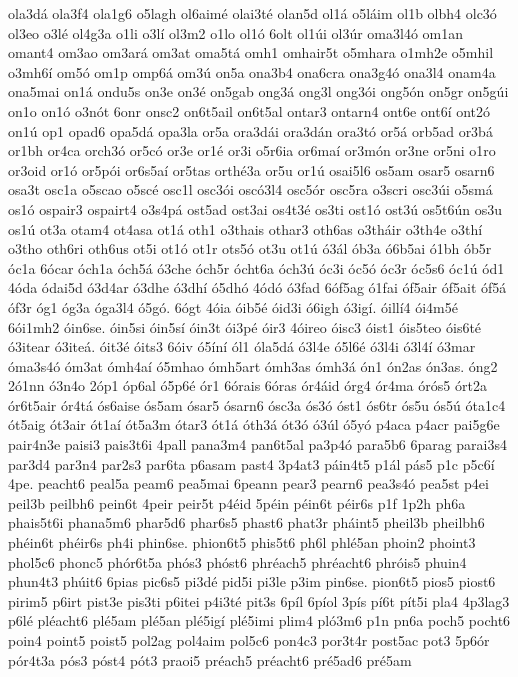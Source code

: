 {ola3dá
ola3f4
ola1g6
o5lagh
ol6aimé
olai3té
olan5d
ol1á
o5láim
ol1b
olbh4
olc3ó
ol3eo
o3lé
ol4g3a
o1li
o3lí
ol3m2
o1lo
ol1ó
6olt
ol1úi
ol3úr
oma3l4ó
om1an
omant4
om3ao
om3ará
om3at
oma5tá
omh1
omhair5t
o5mhara
o1mh2e
o5mhil
o3mh6í
om5ó
om1p
omp6á
om3ú
on5a
ona3b4
ona6cra
ona3g4ó
ona3l4
onam4a
ona5mai
on1á
ondu5s
on3e
on3é
on5gab
ong3á
ong3l
ong3ói
ong5ón
on5gr
on5gúi
on1o
on1ó
o3nót
6onr
onsc2
on6t5ail
on6t5al
ontar3
ontarn4
ont6e
ont6í
ont2ó
on1ú
op1
opad6
opa5dá
opa3la
or5a
ora3dái
ora3dán
ora3tó
or5á
orb5ad
or3bá
or1bh
or4ca
orch3ó
or5có
or3e
or1é
or3i
o5r6ia
or6maí
or3món
or3ne
or5ni
o1ro
or3oid
or1ó
or5pói
or6s5aí
or5tas
orthé3a
or5u
or1ú
osai5l6
os5am
osar5
osarn6
osa3t
osc1a
o5scao
o5scé
osc1l
osc3ói
oscó3l4
osc5ór
osc5ra
o3scri
osc3úi
o5smá
os1ó
ospair3
ospairt4
o3s4pá
ost5ad
ost3ai
os4t3é
os3ti
ost1ó
ost3ú
os5t6ún
os3u
os1ú
ot3a
otam4
ot4asa
ot1á
oth1
o3thais
othar3
oth6as
o3tháir
o3th4e
o3thí
o3tho
oth6ri
oth6us
ot5i
ot1ó
ot1r
ots5ó
ot3u
ot1ú
ó3ál
ób3a
ó6b5ai
ó1bh
ób5r
óc1a
6ócar
óch1a
óch5á
ó3che
óch5r
ócht6a
óch3ú
óc3i
óc5ó
óc3r
óc5s6
óc1ú
ód1
4óda
ódai5d
ó3d4ar
ó3dhe
ó3dhí
ó5dhó
4ódó
ó3fad
6óf5ag
ó1fai
óf5air
óf5ait
óf5á
óf3r
óg1
óg3a
óga3l4
ó5gó.
6ógt
4óia
óib5é
óid3i
ó6igh
ó3igí.
óillí4
ói4m5é
6ói1mh2
óin6se.
óin5si
óin5sí
óin3t
ói3pé
óir3
4óireo
óisc3
óist1
óis5teo
óis6té
ó3itear
ó3iteá.
óit3é
óits3
6óiv
ó5íní
ól1
óla5dá
ó3l4e
ó5l6é
ó3l4i
ó3l4í
ó3mar
óma3s4ó
óm3at
ómh4aí
ó5mhao
ómh5art
ómh3as
ómh3á
ón1
ón2as
ón3as.
óng2
2ó1nn
ó3n4o
2óp1
óp6al
ó5p6é
ór1
6órais
6óras
ór4áid
órg4
ór4ma
órós5
órt2a
ór6t5air
ór4tá
ós6aise
ós5am
ósar5
ósarn6
ósc3a
ós3ó
óst1
ós6tr
ós5u
ós5ú
óta1c4
ót5aig
ót3air
ót1aí
ót5a3m
ótar3
ót1á
óth3á
ót3ó
ó3úl
ó5yó
p4aca
p4acr
pai5g6e
pair4n3e
paisi3
pais3t6i
4pall
pana3m4
pan6t5al
pa3p4ó
para5b6
6parag
parai3s4
par3d4
par3n4
par2s3
par6ta
p6asam
past4
3p4at3
páin4t5
p1ál
pás5
p1c
p5c6í
4pe.
peacht6
peal5a
peam6
pea5mai
6peann
pear3
pearn6
pea3s4ó
pea5st
p4ei
peil3b
peilbh6
pein6t
4peir
peir5t
p4éid
5péin
péin6t
péir6s
p1f
1p2h
ph6a
phais5t6i
phana5m6
phar5d6
phar6s5
phast6
phat3r
pháint5
pheil3b
pheilbh6
phéin6t
phéir6s
ph4i
phin6se.
phion6t5
phis5t6
ph6l
phlé5an
phoin2
phoint3
phol5c6
phonc5
phór6t5a
phós3
phóst6
phréach5
phréacht6
phróis5
phuin4
phun4t3
phúit6
6pias
pic6s5
pi3dé
pid5i
pi3le
p3im
pin6se.
pion6t5
pios5
piost6
pirim5
p6irt
pist3e
pis3ti
p6itei
p4i3té
pit3s
6píl
6píol
3pís
pí6t
pít5i
pla4
4p3lag3
p6lé
pléacht6
plé5am
plé5an
plé5igí
plé5imi
plim4
pló3m6
p1n
pn6a
poch5
pocht6
poin4
point5
poist5
pol2ag
pol4aim
pol5c6
pon4c3
por3t4r
post5ac
pot3
5p6ór
pór4t3a
pós3
póst4
pót3
praoi5
préach5
préacht6
pré5ad6
pré5am
}
